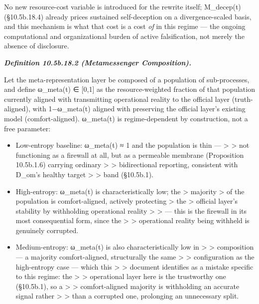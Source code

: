 \documentclass[
]{article}
\begin{document}
No new resource-cost variable is introduced for the rewrite itself;
M\_decep(t) (§10.5b.18.4) already prices sustained self-deception on a
divergence-scaled basis, and this mechanism is what that cost is a cost
\emph{of} in this regime --- the ongoing computational and
organizational burden of active falsification, not merely the absence of
disclosure.

\emph{\textbf{Definition 10.5b.18.2 (Metamessenger Composition).}}

Let the meta-representation layer be composed of a population of
sub-processes, and define ω\_meta(t) ∈ {[}0,1{]} as the
resource-weighted fraction of that population currently aligned with
transmitting operational reality to the official layer (truth-aligned),
with 1−ω\_meta(t) aligned with preserving the official layer's existing
model (comfort-aligned). ω\_meta(t) is regime-dependent by construction,
not a free parameter:

\begin{itemize}
\item
  Low-entropy baseline: ω\_meta(t) ≈ 1 and the population is thin ---
  \textgreater{} \textgreater{} not functioning as a firewall at all,
  but as a permeable membrane (Proposition 10.5b.1.6) carrying ordinary
  \textgreater{} \textgreater{} bidirectional reporting,
  consistent with D\_om's healthy target \textgreater{} \textgreater{}
  band (§10.5b.1).
\item
  High-entropy: ω\_meta(t) is characteristically low; the \textgreater{}
  majority \textgreater{} of the population is comfort-aligned, actively
  protecting \textgreater{} the \textgreater{} official layer's
  stability by withholding operational reality \textgreater{}
  \textgreater{} --- this is the firewall in its most consequential
  form, since the \textgreater{} \textgreater{} operational reality
  being withheld is genuinely corrupted.
\item
  Medium-entropy: ω\_meta(t) is also characteristically low in
  \textgreater{} \textgreater{} composition --- a majority
  comfort-aligned, structurally the same \textgreater{} \textgreater{}
  configuration as the high-entropy case --- which this \textgreater{}
  \textgreater{} document identifies as a mistake specific to this
  regime: the \textgreater{} \textgreater{} operational layer here is
  the trustworthy one (§10.5b.1), so a \textgreater{} \textgreater{}
  comfort-aligned majority is withholding an accurate signal rather
  \textgreater{} \textgreater{} than a corrupted one, prolonging an
  unnecessary split.
\end{itemize}
\end{document}
